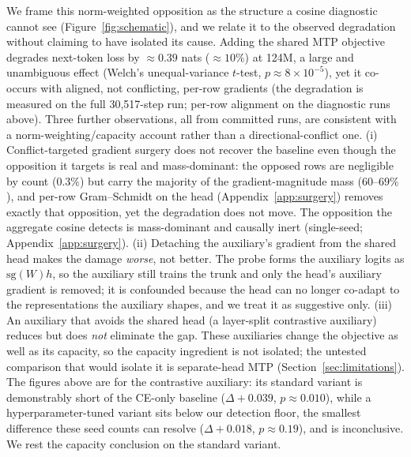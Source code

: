 We frame this norm-weighted opposition as the structure a cosine diagnostic
cannot see (Figure~\ref{fig:schematic}), and we relate it to the observed
degradation without claiming to have isolated its cause. Adding the shared MTP objective degrades next-token loss by
${\approx}0.39$ nats (${\approx}10\%$) at 124M, a large and unambiguous effect
(Welch's unequal-variance $t$-test, $p\approx 8\times10^{-5}$), yet it co-occurs with aligned, not
conflicting, per-row gradients (the degradation is measured on the full
30{,}517-step run; per-row alignment on the diagnostic runs above). Three further
observations, all from committed
runs, are consistent with a norm-weighting/capacity account rather than a
directional-conflict one. (i) Conflict-targeted gradient surgery does not recover
the baseline even though the opposition it targets is real and mass-dominant: the
opposed rows are negligible by count ($0.3\%$) but carry the majority of the
gradient-magnitude mass ($60$--$69\%$), and per-row Gram--Schmidt on the head
(Appendix~\ref{app:surgery}) removes exactly that opposition, yet the degradation
does not move. The opposition the aggregate cosine detects is mass-dominant and causally inert (single-seed; Appendix~\ref{app:surgery}). (ii) Detaching the auxiliary's gradient from
the shared head makes the damage \emph{worse}, not better. The probe forms the
auxiliary logits as $\mathrm{sg}(W)h$, so the auxiliary still trains the trunk and
only the head's auxiliary gradient is removed; it is confounded because the head can
no longer co-adapt to the representations the auxiliary shapes, and we treat it as
suggestive only. (iii)
An auxiliary that avoids the shared head (a layer-split contrastive auxiliary)
reduces but does \emph{not} eliminate the gap. These auxiliaries change the objective
as well as its capacity, so the capacity ingredient is not isolated; the untested comparison that would isolate it is separate-head MTP (Section~\ref{sec:limitations}). The figures above are for the contrastive auxiliary: its standard variant is demonstrably short of the CE-only baseline ($\Delta{+}0.039$, $p \approx 0.010$), while a hyperparameter-tuned variant sits below our detection floor, the smallest difference these seed counts can resolve ($\Delta{+}0.018$, $p \approx 0.19$), and is inconclusive. We rest the capacity conclusion on the standard variant.

